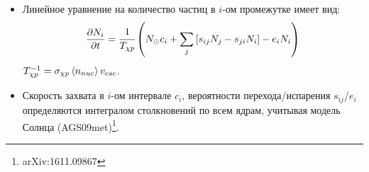 \begin{itemize}
	\item Линейное уравнение на количество частиц в $i$-ом промежутке имеет вид:
	\begin{equation*}
		\frac{\partial N_{i}}{\partial t} = \cfrac{1}{T_{\chi p}} \left(N_{\odot} c_i +
		\sum_j{[s_{ij} N_{j} - s_{ji} N_{i} ]} - e_{i} N_i  \right)
	\end{equation*}
	$T_{\chi p}^{-1} = \sigma_{\chi p} \left\langle n_{nuc} \right\rangle v_{esc}$.
	\item Скорость захвата в $i$-ом интервале $c_i$, вероятности перехода/испарения $s_{ij}$/$e_{i}$ определяются интегралом столкновений по всем ядрам, учитывая модель Солнца (AGS09met)\footnote{arXiv:1611.09867}.
\end{itemize}